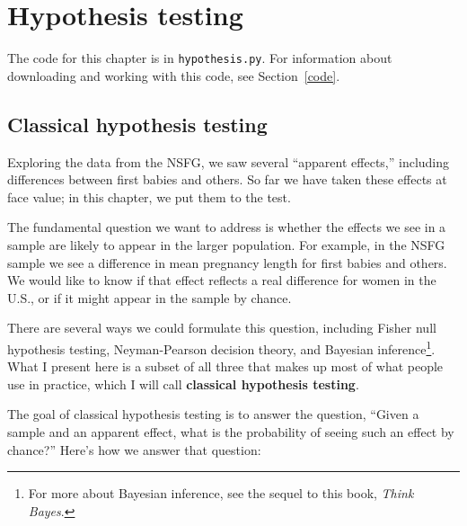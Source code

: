 \documentclass[12pt]{book}
\begin{document}
\chapter{Hypothesis testing}
\label{testing}

The code for this chapter is in {\tt hypothesis.py}.  For information
about downloading and working with this code, see Section~\ref{code}.

\section{Classical hypothesis testing}

Exploring the data from the NSFG, we saw several ``apparent effects,''
including differences between first babies and others.
So far we have taken these effects at face value; in this chapter,
we put them to the test.

The fundamental question we want to address is whether the effects
we see in a sample are likely to appear in the larger population.
For example, in the NSFG sample we see a difference in mean pregnancy
length for first babies and others.  We would like to know if
that effect reflects a real difference for women
in the U.S., or if it might appear in the sample by chance.
 

There are several ways we could formulate this question, including
Fisher null hypothesis testing, Neyman-Pearson decision theory, and
Bayesian inference\footnote{For more about Bayesian inference, see the
  sequel to this book, {\it Think Bayes}.}.  What I present here is a
subset of all three that makes up most of what people use in practice,
which I will call {\bf classical hypothesis testing}.

The goal of classical hypothesis testing is to answer the question,
``Given a sample and an apparent effect, what is the probability of
seeing such an effect by chance?''  Here's how we answer that question:
\end{document}

